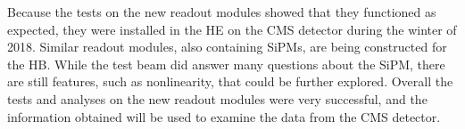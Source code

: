 Because the tests on the new readout modules showed that they functioned as expected, they were installed in the HE on the CMS detector during the winter of 2018. Similar readout modules, also containing SiPMs, are being constructed for the HB. While the test beam did answer many questions about the SiPM, there are still features, such as nonlinearity, that could be further explored. Overall the tests and analyses on the new readout modules were very successful, and the information obtained will be used to examine the data from the CMS detector.

